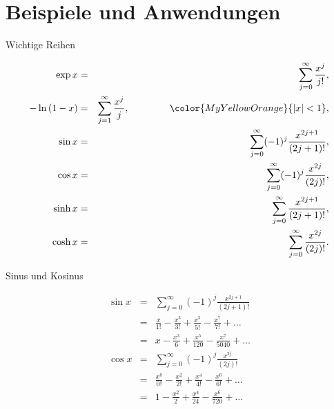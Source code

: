 \documentclass[german]{beamer}
\newcommand{\bq}{\begin{eqnarray*}}
\newcommand{\eq}{\end{eqnarray*}}
\newcommand{\superalert}[1]{{\color{MyYellowOrange}{#1}}}
\begin{document}

\section{Beispiele und Anwendungen}

\frame{\sectionpage}

\begin{frame}{Wichtige Reihen}

{\small
\bq
\exp x & = & \sum\limits_{j=0}^\infty \frac{x^j}{j!},
\nonumber \\
 -\ln\left(1-x\right) & = & \sum\limits_{j=1}^\infty \frac{x^j}{j}, \;\;\;\;\;\;\;\;\;\;\;\;\;\;\; \superalert{|x|<1},
 \nonumber \\
\sin x & = & \sum\limits_{j=0}^\infty (-1)^{j} \frac{x^{2j+1}}{(2j+1)!},
\nonumber \\
\cos x & = & \sum\limits_{j=0}^\infty (-1)^{j} \frac{x^{2j}}{(2j)!},
\nonumber \\
\sinh x & = & \sum\limits_{j=0}^\infty \frac{x^{2j+1}}{(2j+1)!},
\nonumber \\
\cosh x & = & \sum\limits_{j=0}^\infty \frac{x^{2j}}{(2j)!}.
\eq
}

\end{frame}

\begin{frame}{Sinus und Kosinus}

{\small
\bq
\sin x & = & \sum\limits_{j=0}^\infty (-1)^{j} \frac{x^{2j+1}}{(2j+1)!}
\nonumber \\
 & = & 
 \frac{x}{1!} -\frac{x^3}{3!} + \frac{x^5}{5!} - \frac{x^7}{7!} + \dots
\nonumber \\
 & = & 
 x -\frac{x^3}{6} + \frac{x^5}{120} - \frac{x^7}{5040} + \dots
 \nonumber \\
\cos x & = & \sum\limits_{j=0}^\infty (-1)^{j} \frac{x^{2j}}{(2j)!}
\nonumber \\
 & = & 
 \frac{x^0}{0!} - \frac{x^2}{2!} + \frac{x^4}{4!} - \frac{x^6}{6!} + \dots
\nonumber \\
 & = & 
 1 - \frac{x^2}{2} + \frac{x^4}{24} - \frac{x^6}{720} + \dots
\eq
}

\end{frame}
\end{document}
